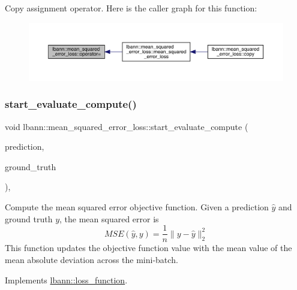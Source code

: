 Copy assignment operator. Here is the caller graph for this function\+:\nopagebreak
\begin{figure}[H]
\begin{center}
\leavevmode
\includegraphics[width=350pt]{classlbann_1_1mean__squared__error__loss_a7b992996646a230f132a4df1608f1973_icgraph}
\end{center}
\end{figure}
\mbox{\label{classlbann_1_1mean__squared__error__loss_a5cfc9b54a4161015f63e5445e34f49f4}} 
\subsubsection{\texorpdfstring{start\+\_\+evaluate\+\_\+compute()}{start\_evaluate\_compute()}}
{\footnotesize\ttfamily void lbann\+::mean\+\_\+squared\+\_\+error\+\_\+loss\+::start\+\_\+evaluate\+\_\+compute (\begin{DoxyParamCaption}\item[{const \hyperlink{base_8hpp_a9a697a504ae84010e7439ffec862b470}{Abs\+Dist\+Mat} \&}]{prediction,  }\item[{const \hyperlink{base_8hpp_a9a697a504ae84010e7439ffec862b470}{Abs\+Dist\+Mat} \&}]{ground\+\_\+truth }\end{DoxyParamCaption})\hspace{0.3cm}{\ttfamily [override]}, {\ttfamily [virtual]}}

Compute the mean squared error objective function. Given a prediction $\hat{y}$ and ground truth $y$, the mean squared error is \[ MSE(\hat{y}, y) = \frac{1}{n} \lVert y - \hat{y} \rVert_2^2 \] This function updates the objective function value with the mean value of the mean absolute deviation across the mini-\/batch. 

Implements \hyperlink{classlbann_1_1loss__function_a0bbe41060d788dc7a29f3737761a6f7d}{lbann\+::loss\+\_\+function}.



